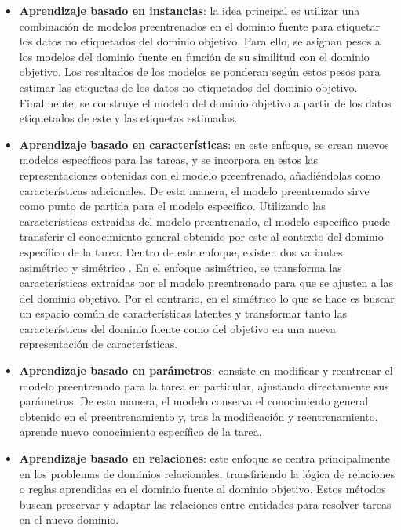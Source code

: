 \documentclass[11pt,spanish,listoffigures,listoftables]{tfgetsinf}
\begin{document}
\begin{itemize}
	\item \textbf{Aprendizaje basado en instancias}: la idea principal es utilizar una combinación de modelos preentrenados en el dominio fuente para etiquetar los datos no etiquetados del dominio objetivo. Para ello, se asignan pesos a los modelos del dominio fuente en función de su similitud con el dominio objetivo. Los resultados de los modelos se ponderan según estos pesos para estimar las etiquetas de los datos no etiquetados del dominio objetivo. Finalmente, se construye el modelo del dominio objetivo a partir de los datos etiquetados de este y las etiquetas estimadas.
	\item \textbf{Aprendizaje basado en características}: en este enfoque, se crean nuevos modelos específicos para las tareas, y se incorpora en estos las representaciones obtenidas con el modelo preentrenado, añadiéndolas como características adicionales. De esta manera, el modelo preentrenado sirve como punto de partida para el modelo específico. Utilizando las características extraídas del modelo preentrenado, el modelo específico puede transferir el conocimiento general obtenido por este al contexto del dominio específico de la tarea. Dentro de este enfoque, existen dos variantes: asimétrico y simétrico  \cite{9134370}. En el enfoque asimétrico, se transforma las características extraídas por el modelo preentrenado para que se ajusten a las del dominio objetivo. Por el contrario, en el simétrico lo que se hace es buscar un espacio común de características latentes y transformar tanto las características del dominio fuente como del objetivo en una nueva representación de características.
	\item \textbf{Aprendizaje basado en parámetros}: consiste en modificar y reentrenar el modelo preentrenado para la tarea en particular, ajustando directamente sus parámetros. De esta manera, el modelo conserva el conocimiento general obtenido en el preentrenamiento y, tras la modificación y reentrenamiento, aprende nuevo conocimiento específico de la tarea.
	\item \textbf{Aprendizaje basado en relaciones}: este enfoque se centra principalmente en los problemas de dominios relacionales, transfiriendo la lógica de relaciones o reglas aprendidas en el dominio fuente al dominio objetivo. Estos métodos buscan preservar y adaptar las relaciones entre entidades para resolver tareas en el nuevo dominio.
\end{itemize}
\end{document}
